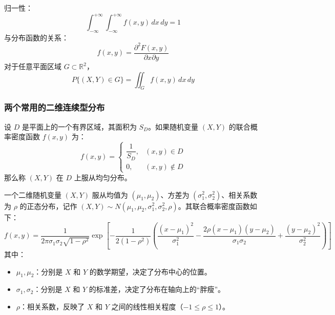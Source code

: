 \begin{property}[联合概率密度函数的性质]
归一性：
\begin{equation}
	\int_{-\infty}^{+\infty} \int_{-\infty}^{+\infty} f(x, y)\,dx\,dy = 1
	\label{eq:第三章:联合密度归一性}
\end{equation}
与分布函数的关系：
\begin{equation}
	f(x, y) = \frac{\partial^{2} F(x, y)}{\partial x \partial y}
	\label{eq:第三章:密度与分布函数关系}
\end{equation}
对于任意平面区域 $G \subset \mathbb{R}^2$，
\begin{equation}
	P\{(X, Y) \in G\} = \iint_G f(x, y)\,dx\,dy
	\label{eq:第三章:区域概率}
\end{equation}
\end{property}

\subsubsection{两个常用的二维连续型分布}
\begin{definition}[二维均匀分布]
设 $D$ 是平面上的一个有界区域，其面积为 $S_D$。如果随机变量 $(X, Y)$ 的联合概率密度函数 $f(x, y)$ 为：
\begin{equation}
	f(x, y) = \begin{cases} \dfrac{1}{S_D}, & (x, y) \in D \\[1ex] 0, & (x, y) \notin D \end{cases}
	\label{eq:第三章:二维均匀}
\end{equation}
那么称 $(X, Y)$ 在 $D$ 上服从均匀分布。
\end{definition}

\begin{definition}[二维正态分布]
一个二维随机变量 $(X, Y)$ 服从均值为 $(\mu_1, \mu_2)$、方差为 $(\sigma_1^2, \sigma_2^2)$、相关系数为 $\rho$ 的正态分布，记作 $(X, Y) \sim N(\mu_1, \mu_2, \sigma_1^2, \sigma_2^2, \rho)$。其联合概率密度函数如下：
\begin{equation}
	f(x, y) = \frac{1}{2\pi\sigma_1\sigma_2\sqrt{1-\rho^2}} \exp\left[ -\frac{1}{2(1-\rho^2)} \left( \frac{(x-\mu_1)^2}{\sigma_1^2} - \frac{2\rho(x-\mu_1)(y-\mu_2)}{\sigma_1\sigma_2} + \frac{(y-\mu_2)^2}{\sigma_2^2} \right) \right]
	\label{eq:第三章:二维正态密度}
\end{equation}
其中：
\begin{itemize}
	\item $\mu_1, \mu_2$：分别是 $X$ 和 $Y$ 的数学期望，决定了分布中心的位置。
	\item $\sigma_1, \sigma_2$：分别是 $X$ 和 $Y$ 的标准差，决定了分布在轴向上的“胖瘦”。
	\item $\rho$：相关系数，反映了 $X$ 和 $Y$ 之间的线性相关程度（$-1 \le \rho \le 1$）。
\end{itemize}
\end{definition}

